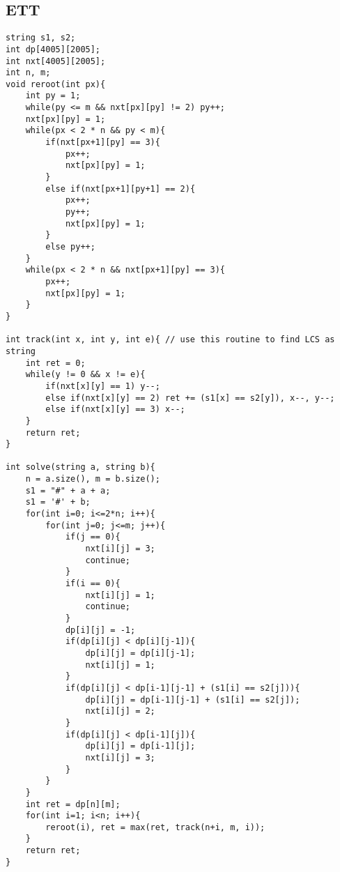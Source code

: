 \documentclass[landscape, 8pt, a4paper, oneside, twocolumn]{extarticle}
\begin{document}
\subsection{ETT}
\begin{verbatim}
string s1, s2;
int dp[4005][2005];
int nxt[4005][2005];
int n, m;
void reroot(int px){
	int py = 1;
	while(py <= m && nxt[px][py] != 2) py++;
	nxt[px][py] = 1;
	while(px < 2 * n && py < m){
		if(nxt[px+1][py] == 3){
			px++;
			nxt[px][py] = 1;
		}
		else if(nxt[px+1][py+1] == 2){
			px++;
			py++;
			nxt[px][py] = 1;
		}
		else py++;
	}
	while(px < 2 * n && nxt[px+1][py] == 3){
		px++;
		nxt[px][py] = 1;
	}
}

int track(int x, int y, int e){ // use this routine to find LCS as string
	int ret = 0;
	while(y != 0 && x != e){
		if(nxt[x][y] == 1) y--;
		else if(nxt[x][y] == 2) ret += (s1[x] == s2[y]), x--, y--;
		else if(nxt[x][y] == 3) x--;
	}
	return ret;
}

int solve(string a, string b){
	n = a.size(), m = b.size();
	s1 = "#" + a + a;
	s1 = '#' + b;
	for(int i=0; i<=2*n; i++){
		for(int j=0; j<=m; j++){
			if(j == 0){
				nxt[i][j] = 3;
				continue;
			}
			if(i == 0){
				nxt[i][j] = 1;
				continue;
			}
			dp[i][j] = -1;
			if(dp[i][j] < dp[i][j-1]){
				dp[i][j] = dp[i][j-1];
				nxt[i][j] = 1;
			}
			if(dp[i][j] < dp[i-1][j-1] + (s1[i] == s2[j])){
				dp[i][j] = dp[i-1][j-1] + (s1[i] == s2[j]);
				nxt[i][j] = 2;
			}
			if(dp[i][j] < dp[i-1][j]){
				dp[i][j] = dp[i-1][j];
				nxt[i][j] = 3;
			}
		}
	}
	int ret = dp[n][m];
	for(int i=1; i<n; i++){
		reroot(i), ret = max(ret, track(n+i, m, i));
	}
	return ret;
}
\end{verbatim}
\end{document}
